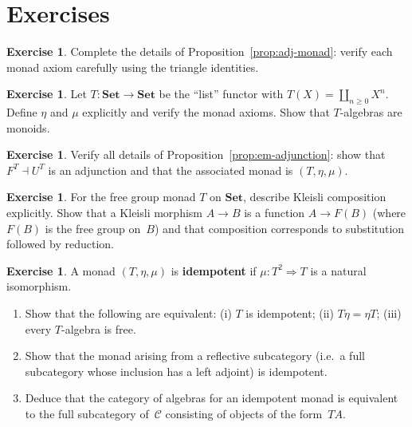\documentclass[a4paper,12pt]{book}
\newcommand{\Set}{\mathbf{Set}}
\theoremstyle{definition}
\newtheorem{exercise}[definition]{Exercise}
\theoremstyle{plain}
\theoremstyle{remark}
\begin{document}
\section{Exercises}\label{sec:monad-exercises}

\begin{exercise}\label{exer:monad-triangle}
Complete the details of Proposition~\ref{prop:adj-monad}:
verify each monad axiom carefully using the triangle identities.
\end{exercise}

\begin{exercise}\label{exer:monad-list}
Let $T\colon\Set\to\Set$ be the ``list'' functor with
$T(X) = \coprod_{n\geq 0}X^n$.  Define $\eta$ and $\mu$ explicitly
and verify the monad axioms.  Show that $T$-algebras are monoids.
\end{exercise}

\begin{exercise}\label{exer:em-adjoint}
Verify all details of Proposition~\ref{prop:em-adjunction}: show that
$F^T\dashv U^T$ is an adjunction and that the associated monad is
$(T,\eta,\mu)$.
\end{exercise}

\begin{exercise}\label{exer:kleisli-composition}
For the free group monad $T$ on $\Set$, describe Kleisli composition
explicitly.  Show that a Kleisli morphism $A\to B$ is a function
$A\to F(B)$ (where $F(B)$ is the free group on~$B$) and that
composition corresponds to substitution followed by reduction.
\end{exercise}

\begin{exercise}\label{exer:idempotent-monad}
A monad $(T,\eta,\mu)$ is \textbf{idempotent} if
$\mu\colon T^2\Rightarrow T$ is a natural isomorphism.
\begin{enumerate}[label=(\alph*)]
\item Show that the following are equivalent: (i) $T$ is idempotent;
    (ii) $T\eta = \eta T$; (iii) every $T$-algebra is free.
\item Show that the monad arising from a reflective subcategory
    (i.e.\ a full subcategory whose inclusion has a left adjoint)
    is idempotent.
\item Deduce that the category of algebras for an idempotent monad
    is equivalent to the full subcategory of~$\mathcal{C}$ consisting
    of objects of the form~$TA$.
\end{enumerate}
\end{exercise}
\end{document}
